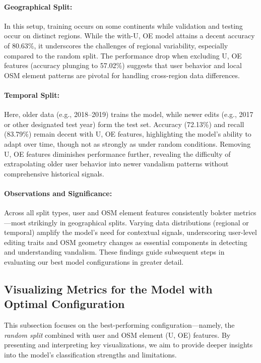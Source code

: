\documentclass[
    13pt, %
    a4paper, %
    listof=totoc, %
    bibliography=totoc, %
    index=totoc, %
    headsepline
]{scrreprt}
\begin{document}
\paragraph{Geographical Split:}
In this setup, training occurs on some continents while validation and testing occur on distinct regions. While the with-U, OE model attains a decent accuracy of 80.63\%, it underscores the challenges of regional variability, especially compared to the random split. The performance drop when excluding U, OE features (accuracy plunging to 57.02\%) suggests that user behavior and local OSM element patterns are pivotal for handling cross-region data differences.

\paragraph{Temporal Split:}
Here, older data (e.g., 2018--2019) trains the model, while newer edits (e.g., 2017 or other designated test year) form the test set. Accuracy (72.13\%) and recall (83.79\%) remain decent with U, OE features, highlighting the model’s ability to adapt over time, though not as strongly as under random conditions. Removing U, OE features diminishes performance further, revealing the difficulty of extrapolating older user behavior into newer vandalism patterns without comprehensive historical signals.

\paragraph{Observations and Significance:}
Across all split types, user and OSM element features consistently bolster metrics—most strikingly in geographical splits. Varying data distributions (regional or temporal) amplify the model’s need for contextual signals, underscoring user-level editing traits and OSM geometry changes as essential components in detecting and understanding vandalism. These findings guide subsequent steps in evaluating our best model configurations in greater detail.

\subsection{Visualizing Metrics for the Model with Optimal Configuration}
\label{sec:visualizing_metrics}

This subsection focuses on the best-performing configuration—namely, the \emph{random split} combined with user and OSM element (U, OE) features. By presenting and interpreting key visualizations, we aim to provide deeper insights into the model’s classification strengths and limitations.
\end{document}
